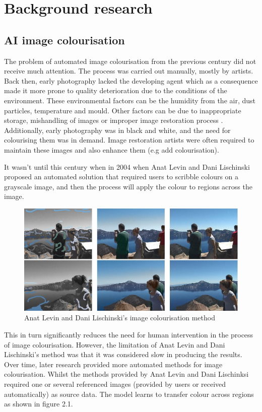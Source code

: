 \chapter{Background research}

\section{AI image colourisation}

The problem of automated image colourisation from the previous century did not receive much attention. The process was carried out manually, mostly by artists. Back then, early photography lacked the developing agent which as a consequence made it more prone to quality deterioration due to the conditions of the environment. These environmental factors can be the humidity from the air, dust particles, temperature and mould. Other factors can be due to inappropriate storage, mishandling of images or improper image restoration process \cite{ware1994mechanism}. Additionally, early photography was in black and white, and the need for colourising them was in demand. Image restoration artists were often required to maintain these images and also enhance them (e.g add colourisation). 

It wasn't until this century when in 2004 when Anat Levin and Dani Lischinski proposed an automated solution \cite{Levin2004} that required users to scribble colours on a grayscale image, and then the process will apply the colour to regions across the image. 

\begin{figure}[H]
    \centering
    \includegraphics[width=0.6\columnwidth]{sections/figures/scribble_technique_colourisation.JPG}
    \caption{Anat Levin and Dani Lischinski's image colourisation method}
    \label{fig:my_label}
\end{figure}

This in turn significantly reduces the need for human intervention in the process of image colourisation. However, the limitation of Anat Levin and Dani Lischinski's method was that it was considered slow in producing the results. Over time, later research provided more automated methods for image colourisation. Whilst the methods provided by Anat Levin and Dani Lischinksi required one or several referenced images (provided by users or received automatically) as source data. The model learns to transfer colour across regions as shown in figure 2.1. 

